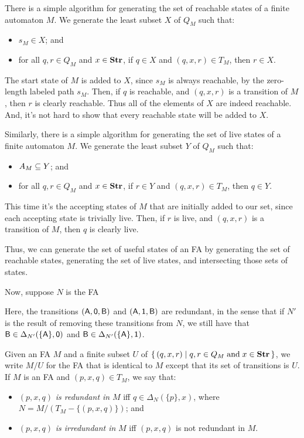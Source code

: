 There is a simple algorithm for generating the set of reachable states
of a finite automaton $M$.  We generate the least subset $X$ of $Q_M$
such that:
\begin{itemize}
\item $s_M\in X$; and

\item for all $q,r\in Q_M$ and $x\in\mathbf{Str}$, if $q\in X$ and
$(q,x,r)\in T_M$, then $r\in X$.
\end{itemize}
The start state of $M$ is added to $X$, since $s_M$ is always
reachable, by the zero-length labeled path $s_M$.  Then, if $q$ is
reachable, and $(q,x,r)$ is a transition of $M$, then $r$ is clearly
reachable.  Thus all of the elements of $X$ are indeed reachable.
And, it's not hard to show that every reachable state will be added to
$X$.

Similarly, there is a simple algorithm for generating the
set of live states of a finite automaton $M$.  We generate the least
subset $Y$ of $Q_M$ such that:
\begin{itemize}
\item $A_M\subseteq Y$; and

\item for all $q,r\in Q_M$ and $x\in\mathbf{Str}$, if $r\in Y$ and
$(q,x,r)\in T_M$, then $q\in Y$.
\end{itemize}
This time it's the accepting states of $M$ that are initially added
to our set, since each accepting state is trivially live.
Then, if $r$ is live, and $(q,x,r)$ is a transition
of $M$, then $q$ is clearly live.

Thus, we can generate the set of useful states of an FA by generating
the set of reachable states, generating the set of live states, and
intersecting those sets of states.

Now, suppose $N$ is the FA
\begin{center}
  
\end{center}
Here, the transitions $(\mathsf{A},\mathsf{0},\mathsf{B})$ and $(\mathsf{A},\mathsf{1},\mathsf{B})$
are redundant, in the sense that if $N'$ is the result of removing these
transitions from $N$, we still have that $\mathsf{B}\in\Delta_{N'}(\{\mathsf{A}\},\mathsf{0})$
and $\mathsf{B}\in\Delta_{N'}(\{\mathsf{A}\},\mathsf{1})$.

Given an FA $M$ and a finite subset $U$ of $\{ \, (q,x,r) \mid q,r\in
  Q_M\;\allowbreak\mbox{and}\allowbreak\; x\in\mathbf{Str} \, \}$, we write $M/U$ for the FA that is
identical to $M$ except that its set of transitions is $U$.  If $M$ is
an FA and $(p,x,q)\in T_M$, we say that:
\begin{itemize}
\item $(p,x,q)$ \emph{is redundant in} $M$ iff
  $q\in\Delta_{N}(\{p\},x)$, where $N=M/(T_M-\{(p,x,q)\})$; and
%
%

\item $(p,x,q)$ \emph{is irredundant in} $M$ iff $(p,x,q)$ is not
  redundant in $M$.
%
%
\end{itemize}

